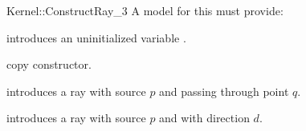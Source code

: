 \begin{ccRefFunctionObjectConcept}{Kernel::ConstructRay_3}
A model for this must provide:



\ccHidden {}
             {introduces an uninitialized variable .}

\ccHidden {}
 	    {copy constructor.}

            {introduces a ray  
             with source $p$ and passing through point $q$.}

            {introduces a ray  with source $p$ and with 
             direction $d$.}

\ccSeeAlso
{}\\

\end{ccRefFunctionObjectConcept}
